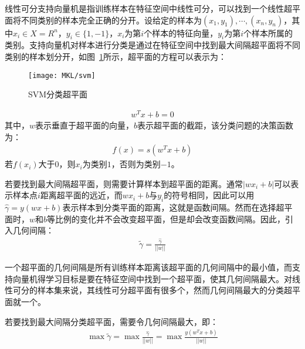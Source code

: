 线性可分支持向量机是指训练样本在特征空间中线性可分，可以找到一个线性超平面将不同类别的样本完全正确的分开。设给定的样本为$(x_{1},y_{1}),\cdots,(x_{n},y_{n})$，其中$x_{i}\in X = R^{n}$，$y_{i}\in \{1,-1\}$，$x_{i}$为第$i$个样本的特征向量，$y_{i}$为第$i$个样本所属的类别。支持向量机对样本进行分类是通过在特征空间中找到最大间隔超平面将不同类别的样本划分开，如图~\ref{fig:svm}所示，超平面的方程可以表示为：
\begin{figure}%
  \centering
  \texttt{[image: MKL/svm]}
  \caption{SVM分类超平面}
  \label{fig:svm}
\end{figure}
\begin{eqnarray}
w^{T}x+b=0
\end{eqnarray}
其中，$w$表示垂直于超平面的向量，$b$表示超平面的截距，该分类问题的决策函数为：
\begin{eqnarray}
f(x)=s(w^{T}x+b)
\end{eqnarray}
若$f(x_{i})$大于0，则$x_{i}$为类别$1$，否则为类别$-1$。

若要找到最大间隔超平面，则需要计算样本到超平面的距离。通常$|wx_{i}+b|$可以表示样本点$i$距离超平面的远近，而$wx_{i}+b$与$y_{i}$的符号相同，因此可以用$\hat{\gamma}=y(wx+b)$表示样本到分类平面的距离，这就是函数间隔。然而在选择超平面时，$w$和$b$等比例的变化并不会改变超平面，但是却会改变函数间隔。因此，引入几何间隔：
\begin{eqnarray}
\tilde{\gamma}=\frac{\hat{\gamma}}{||w||}
\end{eqnarray}

一个超平面的几何间隔是所有训练样本距离该超平面的几何间隔中的最小值，而支持向量机得学习目标是要在特征空间中找到一个超平面，使其几何间隔最大。对线性可分的样本集来说，其线性可分超平面有很多个，然而几何间隔最大的分类超平面就一个。

若要找到最大间隔分类超平面，需要令几何间隔最大，即：
\begin{eqnarray}
\max \tilde{\gamma}=\max\frac{\hat{\gamma}}{||w||}=\max\frac{y(w^{T}x+b)}{||w||}
\end{eqnarray}

